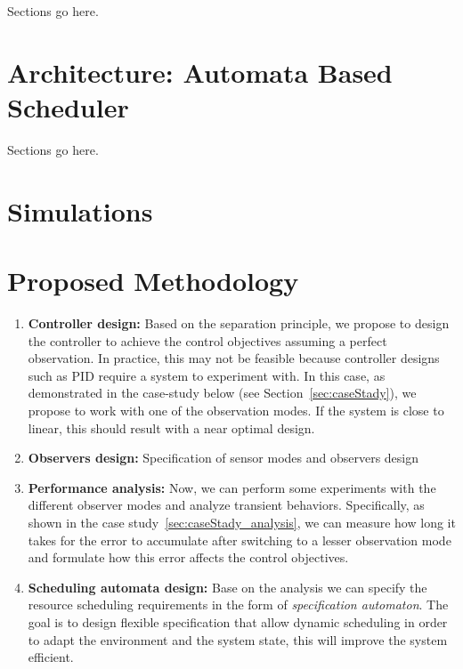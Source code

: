 \documentclass{sig-alternate-ipsn13}
\begin{document}
Sections go here.

\section{Architecture: Automata Based Scheduler}

Sections go here.

\section{Simulations}
\label{sec:simulation}

\section{Proposed Methodology}
\begin{enumerate}
    
    \item \textbf{Controller design:} Based on the separation principle, we propose to design the controller to achieve the control objectives assuming a perfect observation. In practice, this may not be feasible because controller designs such as PID require a system to experiment with. In this case, as demonstrated in the case-study below (see Section~\ref{sec:caseStady}), we propose to work with one of the observation modes. If the system is close to linear, this should result with a near optimal design.
    
    \item \textbf{Observers design:} Specification of sensor modes and observers design
    
    \item \textbf{Performance analysis:} Now, we can perform some experiments with the different observer modes and analyze transient behaviors. Specifically, as shown in the case study~\ref{sec:caseStady_analysis}, we can measure how long it takes for the error to accumulate after switching to a lesser observation mode and formulate how this error affects the control objectives.

    \item \textbf{Scheduling automata design:} Base on the analysis we can specify the resource scheduling requirements in the form of \textit{specification automaton}. The goal is to design flexible specification that allow dynamic scheduling in order to adapt the environment and the system state, this will improve the system efficient.

\end{enumerate}
\end{document}
